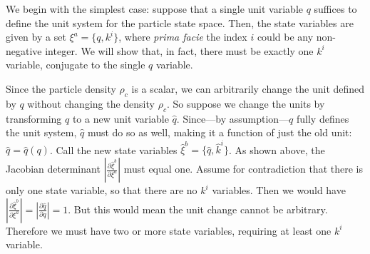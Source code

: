 \documentclass[letterpaper]{article}
\begin{document}
We begin with the simplest case: suppose that a single unit variable $q $ suffices to define the unit system for the particle state space. Then, the state variables are given by a set $\xi^a = \{ q, k^i \}$, where \textit{prima facie} the index $i$ could be any non-negative integer. We will show that, in fact, there must be exactly one $k^i$ variable, conjugate to the single $q$ variable. 

Since the particle density $\rho_c$ is a scalar, we can arbitrarily change the unit defined by $q$ without changing the density $\rho_c$. So suppose we change the units by transforming $q$ to a new unit variable $\hat{q}$. Since---by assumption---$q$ fully defines the unit system, $\hat{q}$ must do so as well, making it a function of just the old unit: $\hat{q}=\hat{q}(q)$. Call the new state variables $\hat{\xi}^b = \{ \hat{q}, \hat{k}^i\}$. As shown above, the Jacobian determinant $\left|\frac{\partial \hat{\xi}^b}{\partial \xi^a} \right|$ must equal one. Assume for contradiction that there is only one state variable, so that there are no $k^i$ variables. Then we would have $\left|\frac{\partial \hat{\xi}^b}{\partial \xi^a} \right| = \left|\frac{\partial \hat q}{\partial q} \right| = 1$. But this would mean the unit change cannot be arbitrary. Therefore we must have two or more state variables, requiring at least one $k^i$ variable. 
\end{document}
